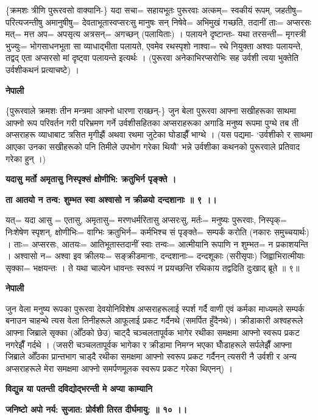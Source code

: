 \documentclass[11pt, a5paper]{article}
\begin{document}
\{क्रमशः त्रीणि पुरूरवसो वाक्यानि-\} यदा सचा= सहायभूतः पुरूरवाः अत्कम्= स्वकीयं रूपम्, जहतीषु= परित्यजन्तीषु अमानुषीषु= देवताभूतास्वप्सरःसु मानुषः सन् निषेवे= अभिमुखं गच्छति, तदानीं ताः= अप्सरसः मत्= मत्त अप= अपसृत्य अत्रसन्= अगच्छन् (पलायिताः) । पलायने दृष्टान्तः- यथा तरसन्ती= मृगस्त्री भुज्युः= भोगसाधनभूता सा व्याधाद्भीता पलायते, एवमेव रथस्पृशो नाश्वा= रथे नियुक्ता अश्वाः पलायन्ते, तद्वद् एता अप्सरसो मां दृष्ट्‌वा पलायन्ते इत्यर्थः । (पुरूरवा अनेकाभिरप्सरोभिः सह उर्वशी त्वया भुक्तेति उर्वशीकथनं प्रत्याचष्टे) ।

\textbf{नेपाली}

\{पुरूरवाले क्रमशः तीन मन्त्रमा आफ्नो धारणा राख्छन्-\} जुन बेला पुरूरवा आफ्ना सखीहरूका साथमा आफ्नो रूप परिवर्तन गरी परिभ्रमण गर्ने उर्वशीसहितका अप्सराहरूका अगाडि मनुष्य रूपमा पुग्थे तब ती अप्सराहरू व्याधाबाट त्रसित मृगीझैं अथवा रथमा जुटेका घोडाझैँ भाग्थे । (यस पद्यमा- ‘उर्वशीको र साथमा आएका उनका सखीहरूको पनि तिमीले उपभोग गरेका थियौ’ भन्ने उर्वशीका कथनको पुरूरवाले प्रतिवाद गरेका हुन् ।)

\textbf{यदासु मर्तो अमृतासु निस्पृक्सं क्षोणीभि: क्रतुभिर्न पृङ्क्ते ।}

\textbf{ता आतयो न तन्व: शुम्भत स्वा अश्वासो न क्रीळयो दन्दशानाः ॥ ९ ।।}

यत्= यदा आसु = एतासु, अमृतासु= मरणधर्मरितासु अप्सरःसु, मर्तः= मनुष्यः पुरूरवाः, निस्पृक्= निःशेषेण स्पृशन्, क्षोणीभिः= वाग्भिः क्रतुभिर्न= कर्मभिश्च सं पृङ्क्ते= सम्पर्कं करोति (नकारः समुच्चयार्थः) । ताः= अप्सरसः, आतयः= आतिभूतास्तदानीं स्वाः तन्वः= आत्मीयानि रूपाणि न शुम्भत= न प्रकाशयन्ति । अश्वासो  न= अश्वा इव क्रीलयः= सङ्‌क्रीडमानाः, दन्दशानाः= दन्दशूकाः (सरीसृपाः) जिह्वाभिरात्मीयाः सृक्का= भक्षयन्तः । ते यथा चाल्पेन धावन्तः स्वरूपं न प्रयच्छन्ति रथिकाय तद्वदिति दुःखाद्‌ ब्रूते ॥ ९॥

\textbf{नेपाली}

जुन वेला मनुष्य रूपका पुरूरवा देवयोनिविशेष अप्सराहरूलाई स्पर्श गर्दै वाणी एवं कर्मका माध्यमले सम्पर्क बनाउन चाहन्थे त्यस वेला तिनीहरूले आफूलाई प्रकट गर्दैनथे (समर्पित हुँदैनथे)। क्रीडाकारी अश्वहरूले आफ्ना जिब्राले सृक्का (ओँठको छेउ) चाट्दै चञ्चलतापूर्वक भागेर रथीका समक्षमा आफ्नो स्वरूप प्रकट नगरेझैँ गर्दथे । (जसरी चञ्चलतापूर्वक भागेका र क्रीडामा निमग्न भएका घोँडाहरूले सर्पलेझैँ आफ्ना जिब्राले ओँठका प्रान्तभाग चाड्दै रथीका समक्षमा आफ्नो स्वरूप प्रकट गर्दैनन् त्यसरी नै उर्वशी र अन्य अप्सराहरूले मेरा समक्षमा आफ्नो समर्पणमूलक स्वरूप प्रकट गरेका थिएनन्) ।

\textbf{विद्युन्न या पतन्ती दविद्योद्भरन्ती मे अप्या काम्यानि}

\textbf{जनिष्टो अपो नर्य: सुजात: प्रोर्वशी तिरत दीर्घमायु: ॥ १० ।।}
\end{document}
